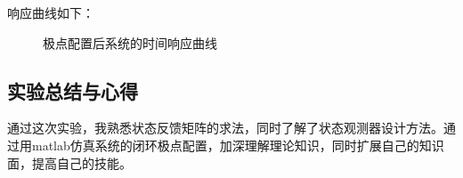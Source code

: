 \documentclass[UTF8]{ctexart}
\begin{document}
\par 响应曲线如下：
\newpage	
\par \begin{figure}      
 \caption{\label{1} 极点配置后系统的时间响应曲线} 
 \end{figure}	
	
\subsection{实验总结与心得}	
\par  	通过这次实验，我熟悉状态反馈矩阵的求法，同时了解了状态观测器设计方法。通过用matlab仿真系统的闭环极点配置，加深理解理论知识，同时扩展自己的知识面，提高自己的技能。	
\end{document}
